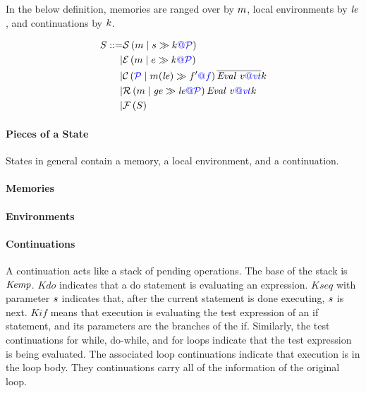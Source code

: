 \documentclass{llncs}
\begin{document}
In the below definition, memories are ranged over by \(\mem\), local environments by
\(\lenv\), and continuations by \(\cont\).

\[\begin{aligned}
S ::= & \sstate{\PCT}{\mem}{\stmt}{\cont} \\
| & \estate{\PCT}{\mem}{\expr}{\cont} \\
| & \cstate{f}{\PCT}{\mem}{\lenv}{f'}{\overline{\val{v}{\vt}}}{\cont} \\
| & \rstate{\PCT}{\mem}{\genv}{\lenv}{\val{v}{\vt}}{\cont} \\
| & \fstate{S} \\
\end{aligned}\]

\paragraph*{Pieces of a State}

States in general contain a memory, a local environment, and a continuation.

\paragraph*{Memories}

\paragraph*{Environments}

\paragraph*{Continuations}
\label{app:continuations}

A continuation acts like a stack of pending operations. The base of the stack is
\(\kemp\). \(\mathit{Kdo}\) indicates that a do statement is evaluating an expression.
\(\mathit{Kseq}\) with parameter \(\stmt\) indicates that, after the current statement
is done executing, \(\stmt\) is next. \(\mathit{Kif}\) means that execution is evaluating
the test expression of an if statement, and its parameters are the branches of the
if. Similarly, the test continuations for while, do-while, and for loops indicate that
the test expression is being evaluated. The associated loop continuations indicate that
execution is in the loop body. They continuations carry all of the information of the original
loop.
\end{document}
